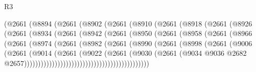 \begin{lexlean}{R3}
\begin{coremodule}
                  (@2661
                    (@8894
                      (@2661
                        (@8902
                          (@2661
                            (@8910
                              (@2661
                                (@8918
                                  (@2661
                                    (@8926
                                      (@2661
                                        (@8934
                                          (@2661
                                            (@8942
                                              (@2661
                                                (@8950
                                                  (@2661
                                                    (@8958
                                                      (@2661
                                                        (@8966
                                                          (@2661
                                                            (@8974
                                                              (@2661
                                                                (@8982
                                                                  (@2661
                                                                    (@8990
                                                                      (@2661
                                                                        (@8998
                                                                          (@2661
                                                                            (@9006
                                                                              (@2661
                                                                                (@9014
                                                                                  (@2661
                                                                                    (@9022
                                                                                      (@2661
                                                                                        (@9030
                                                                                          (@2661
                                                                                            (@9034
                                                                                              @9036
                                                                                              @2682
                                                                                              @2657)))))))))))))))))))))))))))))))))))))))))))))

\end{coremodule}
\end{lexlean}
